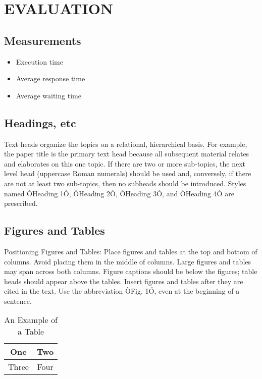 \documentclass[12pt,journal,compsoc]{IEEEtran}
\begin{document}
\section{EVALUATION}
\subsection{Measurements}
\begin{itemize}
   \item Execution time
   \item Average response time
   \item Average waiting time
\end{itemize}





\subsection{Headings, etc}

Text heads organize the topics on a relational, hierarchical basis. For example, the paper title is the primary text head because all subsequent material relates and elaborates on this one topic. If there are two or more sub-topics, the next level head (uppercase Roman numerals) should be used and, conversely, if there are not at least two sub-topics, then no subheads should be introduced. Styles named ÒHeading 1Ó, ÒHeading 2Ó, ÒHeading 3Ó, and ÒHeading 4Ó are prescribed.

\subsection{Figures and Tables}

Positioning Figures and Tables: Place figures and tables at the top and bottom of columns. Avoid placing them in the middle of columns. Large figures and tables may span across both columns. Figure captions should be below the figures; table heads should appear above the tables. Insert figures and tables after they are cited in the text. Use the abbreviation ÒFig. 1Ó, even at the beginning of a sentence.

\begin{table}[h]
\caption{An Example of a Table}
\label{table_example}
\begin{center}
\begin{tabular}{|c||c|}
\hline
One & Two\\
\hline
Three & Four\\
\hline
\end{tabular}
\end{center}
\end{table}
\end{document}
